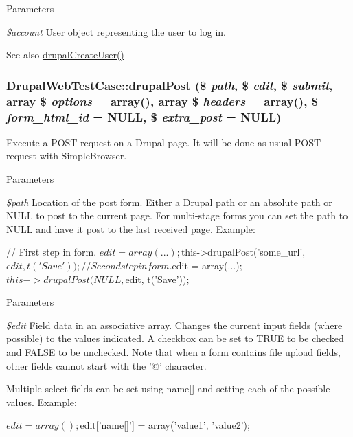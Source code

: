 \begin{DoxyParams}{Parameters}
\item[{\em \$account}]User object representing the user to log in.\end{DoxyParams}
\begin{DoxySeeAlso}{See also}
\hyperlink{classDrupalWebTestCase_acc3d96e30db573b45744aef79af11862}{drupalCreateUser()} 
\end{DoxySeeAlso}
\hypertarget{classDrupalWebTestCase_acbc229f81258bb985a1f011a4a5a99a3}{
\subsubsection[{drupalPost}]{\setlength{\rightskip}{0pt plus 5cm}DrupalWebTestCase::drupalPost (\$ {\em path}, \/  \$ {\em edit}, \/  \$ {\em submit}, \/  array \$ {\em options} = {\ttfamily array()}, \/  array \$ {\em headers} = {\ttfamily array()}, \/  \$ {\em form\_\-html\_\-id} = {\ttfamily NULL}, \/  \$ {\em extra\_\-post} = {\ttfamily NULL})}}
\label{classDrupalWebTestCase_acbc229f81258bb985a1f011a4a5a99a3}
Execute a POST request on a Drupal page. It will be done as usual POST request with SimpleBrowser.


\begin{DoxyParams}{Parameters}
\item[{\em \$path}]Location of the post form. Either a Drupal path or an absolute path or NULL to post to the current page. For multi-\/stage forms you can set the path to NULL and have it post to the last received page. Example:\end{DoxyParams}

\begin{DoxyCode}
   // First step in form.
   $edit = array(...);
   $this->drupalPost('some_url', $edit, t('Save'));

   // Second step in form.
   $edit = array(...);
   $this->drupalPost(NULL, $edit, t('Save'));
\end{DoxyCode}
 
\begin{DoxyParams}{Parameters}
\item[{\em \$edit}]Field data in an associative array. Changes the current input fields (where possible) to the values indicated. A checkbox can be set to TRUE to be checked and FALSE to be unchecked. Note that when a form contains file upload fields, other fields cannot start with the '@' character.\end{DoxyParams}
Multiple select fields can be set using name\mbox{[}\mbox{]} and setting each of the possible values. Example: 
\begin{DoxyCode}
   $edit = array();
   $edit['name[]'] = array('value1', 'value2');
\end{DoxyCode}
 
